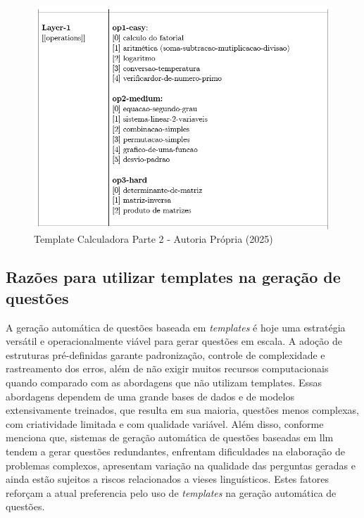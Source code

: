 \begin{figure}
    \centering
    \includegraphics[width=12cm]{./imagens/capitulo4/template-2.png}
    \caption{Template Calculadora Parte 2 - Autoria Própria (2025)}
    \label{fig:template-2}
\end{figure}


\subsection{Razões para utilizar templates na geração de questões}

A geração automática de questões baseada em \textit{templates} é hoje uma estratégia versátil e operacionalmente viável para gerar questões em escala. A adoção de estruturas pré-definidas garante padronização, controle de complexidade e rastreamento dos erros, além de não exigir muitos recursos computacionais quando comparado com  as abordagens que não utilizam templates. Essas abordagens dependem de uma grande bases de dados e de modelos extensivamente treinados, que resulta em sua maioria, questões menos complexas, com criatividade limitada e com qualidade variável. Além disso, conforme \parencite{maity2024} menciona que, sistemas de geração automática de questões  baseadas em \gls{llm} tendem a gerar questões redundantes, enfrentam dificuldades na elaboração de problemas complexos, apresentam variação na qualidade das perguntas geradas e ainda estão sujeitos a riscos relacionados a vieses linguísticos. Estes fatores reforçam a atual preferencia pelo uso de \textit{templates} na geração automática de questões.